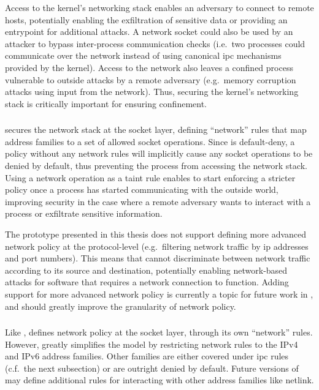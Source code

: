 Access to the kernel's networking stack enables an adversary to connect to remote hosts,
potentially enabling the exfiltration of sensitive data or providing an entrypoint for
additional attacks. A network socket could also be used by an attacker to bypass
inter-process communication checks (i.e.~two processes could communicate over the network
instead of using canonical \gls{ipc} mechanisms provided by the kernel). Access to the
network also leaves a confined process vulnerable to outside attacks by a remote adversary
(e.g.~memory corruption attacks using input from the network). Thus, securing the kernel's
networking stack is critically important for ensuring confinement.

\subsubsection{\bpfbox{}}

\bpfbox{} secures the network stack at the socket layer, defining \enquote{network} rules
that map address families to a set of allowed socket operations. Since \bpfbox{} is
default-deny, a policy without any network rules will implicitly cause any socket
operations to be denied by default, thus preventing the process from accessing the network
stack. Using a network operation as a taint rule enables \bpfbox{} to start enforcing
a stricter policy once a process has started communicating with the outside world,
improving security in the case where a remote adversary wants to interact with a process
or exfiltrate sensitive information.

The \bpfbox{} prototype presented in this thesis does not support defining more advanced
network policy at the protocol-level (e.g.~filtering network traffic by \gls{ip} addresses
and port numbers). This means that \bpfbox{} cannot discriminate between network traffic
according to its source and destination, potentially enabling network-based attacks for
software that requires a network connection to function.  Adding support for more advanced
network policy is currently a topic for future work in \bpfcontain{}, and should greatly
improve the granularity of network policy.

\subsubsection{\bpfcontain{}}

Like \bpfbox{}, \bpfcontain{} defines network policy at the socket layer, through its own
\enquote{network} rules. However, \bpfcontain{} greatly simplifies the \bpfbox{} model by
restricting network rules to the IPv4 and IPv6 address families. Other families are either
covered under \gls{ipc} rules (c.f.~the next subsection) or are outright denied by
default. Future versions of \bpfcontain{} may define additional rules for interacting with
other address families like netlink.

